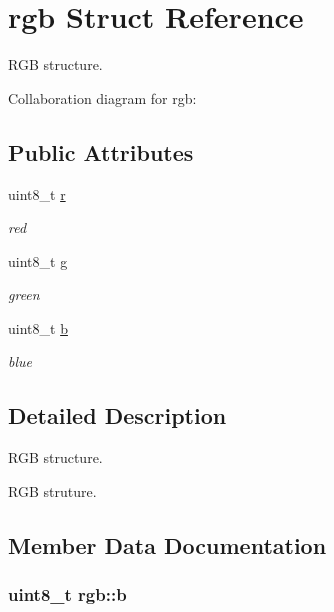 \hypertarget{structrgb}{}\section{rgb Struct Reference}
\label{structrgb}


R\+GB structure.  




Collaboration diagram for rgb\+:
\subsection*{Public Attributes}
\begin{DoxyCompactItemize}
\item 
uint8\+\_\+t \hyperlink{structrgb_afd9a3feaf22de2f96ba25d19494235a6}{r}
\begin{DoxyCompactList}\small\item\em red \end{DoxyCompactList}\item 
uint8\+\_\+t \hyperlink{structrgb_a644713f43fbcf5e9f070fa1843aee55f}{g}
\begin{DoxyCompactList}\small\item\em green \end{DoxyCompactList}\item 
uint8\+\_\+t \hyperlink{structrgb_a5ff4e0f515919a82c3f401afa8555da4}{b}
\begin{DoxyCompactList}\small\item\em blue \end{DoxyCompactList}\end{DoxyCompactItemize}


\subsection{Detailed Description}
R\+GB structure. 

R\+GB struture. 

\subsection{Member Data Documentation}
\subsubsection[{\texorpdfstring{b}{b}}]{\setlength{\rightskip}{0pt plus 5cm}uint8\+\_\+t rgb\+::b}\hypertarget{structrgb_a5ff4e0f515919a82c3f401afa8555da4}{}\label{structrgb_a5ff4e0f515919a82c3f401afa8555da4}


